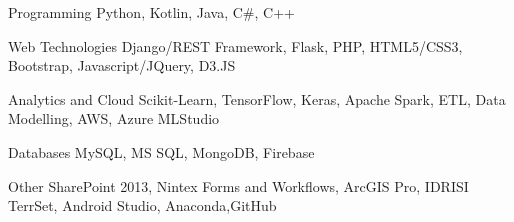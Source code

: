 

\begin{cvskills}

  \vspace{2mm}
  \cvskill
    {Programming} %
    {Python, Kotlin, Java, C\#, C++} %

  \vspace{2mm}
  \cvskill
    {Web Technologies} %
    {Django/REST Framework, Flask, PHP, HTML5/CSS3, Bootstrap, Javascript/JQuery, D3.JS} %

  \vspace{2mm}
  \cvskill
    {Analytics and Cloud} %
    {Scikit-Learn, TensorFlow, Keras, Apache Spark, ETL, Data Modelling, AWS, Azure MLStudio } %

  \vspace{2mm}
  \cvskill
    {Databases} %
    {MySQL, MS SQL, MongoDB, Firebase} %

  \cvskill
    {Other} %
    {SharePoint 2013, Nintex Forms and Workflows, ArcGIS Pro, IDRISI TerrSet, Android Studio, Anaconda,\newline GitHub} %

\end{cvskills}
